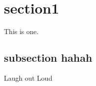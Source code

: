 \documentclass[a4paper]{article}
\begin{document}

\tableofcontents

\newpage %
\section{section1}
This is one.
\subsection{subsection hahah}
Laugh out Loud
\end{document}
